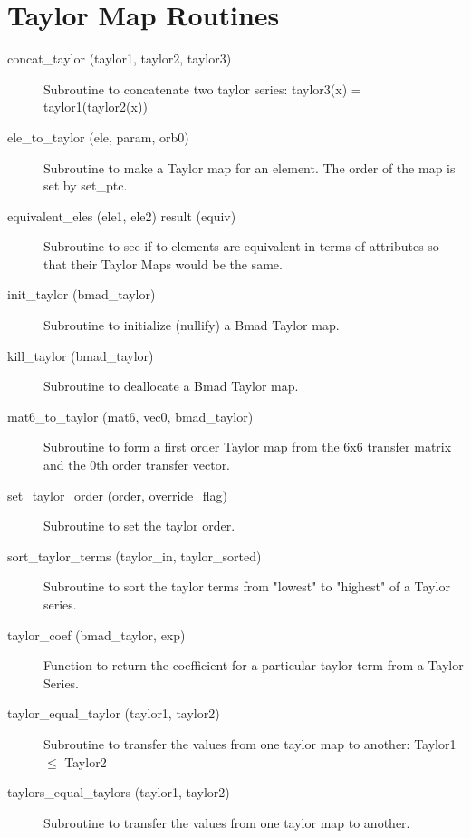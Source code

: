 \section{Taylor Map Routines}
\label{r:taylor}   

\begin{description}

\item[concat\_taylor (taylor1, taylor2, taylor3)] \Newline
Subroutine to concatenate two taylor series: taylor3(x) = taylor1(taylor2(x)) 

\item[ele\_to\_taylor (ele, param, orb0)] \Newline
Subroutine to make a Taylor map for an element. The order of the map is set by set\_ptc.

\item[equivalent\_eles (ele1, ele2) result (equiv)] \Newline 
Subroutine to see if to elements are equivalent in terms of attributes so
that their Taylor Maps would be the same. 

\item[init\_taylor (bmad\_taylor)] \Newline
Subroutine to initialize (nullify) a Bmad Taylor map. 

\item[kill\_taylor (bmad\_taylor)] \Newline
Subroutine to deallocate a Bmad Taylor map. 

\item[mat6\_to\_taylor (mat6, vec0, bmad\_taylor)] \Newline
Subroutine to form a first order Taylor map from the 6x6 transfer matrix 
and the 0th order transfer vector. 

\item[set\_taylor\_order (order, override\_flag)] \Newline
Subroutine to set the taylor order. 

\item[sort\_taylor\_terms (taylor\_in, taylor\_sorted)] \Newline
Subroutine to sort the taylor terms from "lowest" to "highest" of a Taylor series. 

\item[taylor\_coef (bmad\_taylor, exp)] \Newline 
Function to return the coefficient for a particular taylor term from a Taylor Series.

\item[taylor\_equal\_taylor (taylor1, taylor2)] \Newline
Subroutine to transfer the values from one taylor map to another: Taylor1 $\le$ Taylor2 

\item[taylors\_equal\_taylors (taylor1, taylor2)] \Newline 
Subroutine to transfer the values from one taylor map to another.


\end{description}

